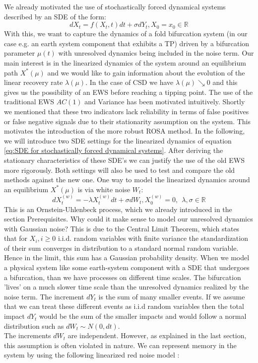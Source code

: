 \documentclass[%
thesis=student,%
coverpage=false,%
titlepage=false,%
headmarks=true, %
english,%
font=libertine, %
math=newpxtx, %
BCOR=5mm,%
coverBCOR=11mm%
]{tumbook}
\begin{document}
We already motivated the use of stochastically forced dynamical systems described by an SDE of the form:
\begin{equation}
    dX_{t} = f(X_{t},t)dt + \sigma dY_{t}, X_{0} = x_{0} \in \mathbb{R}
    \label{eq:SDE for stochastically forced dynamical systems}
\end{equation}
With this, we want to capture the dynamics of a fold bifurcation system (in our case e.g. an earth system component that exhibits a TP) driven by a bifurcation parameter $\mu(t)$ with unresolved dynamics being included in the noise term. Our main interest is in the linearized dynamics of the system around an equilibrium path $X^{*}(\mu)$ and we would like to gain information about the evolution of the linear recovery rate $\lambda(\mu)$. In the case of CSD we have $\lambda(\mu) \searrow 0$ and this gives us the possibility of an EWS before reaching a tipping point. The use of the traditional EWS $AC(1)$ and Variance has been motivated intuitively. Shortly we mentioned that these two indicators lack reliability in terms of false positives or false negative signals due to their stationarity assumption on the system. This motivates the introduction of the more robust ROSA method. 
In the following, we will introduce two SDE settings for the linearized dynamics of equation \ref{eq:SDE for stochastically forced dynamical systems}. 
After deriving the stationary characteristics of these SDE's we can justify the use of the old EWS more rigorously. Both settings will also be used to test and compare the old methods against the new one.
One way to model the linearized dynamics around an equilibrium $X^{*}(\mu)$ is via white noise $W_{t}$:
\begin{equation}
        dX_{t}^{(w)} = -\lambda X_{t}^{(w)}dt + \sigma dW_{t}, X_{0}^{(w)} = 0, \ \ \lambda,\sigma \in \mathbb{R}
        \label{eq: white noise linearized SDE}
\end{equation}
This is an Ornstein-Uhlenbeck process, which we already introduced in the section Prerequisites. Why could it make sense to model our unresolved dynamics with Gaussian noise? This is due to the Central Limit Theorem, which states that for $X_{i}, i \geq 0$ i.i.d. random variables with finite variance the standardization of their sum converges in distribution to a standard normal random variable. Hence in the limit, this sum has a Gaussian probability density. When we model a physical system like some earth-system component with a SDE that undergoes a bifurcation, than we have processes on different time scales. The bifurcation 'lives' on a much slower time scale than the unresolved dynamics realized by the noise term. The increment $dY_{t}$ is the sum of many smaller events. If we assume that we can treat these different events as i.i.d random variables then the total impact $dY_{t}$ would be the sum of the smaller impacts and would follow a normal distribution such as $dW_{t} \sim N(0,dt)$. \cite{Kurt:2010} \\
The increments $dW_{t}$ are independent. However, as explained in the last section, this assumption is often violated in nature. We can represent memory in the system by using the following linearized red noise model \cite{Hanggi:1994,Morr:2022}:
\end{document}
